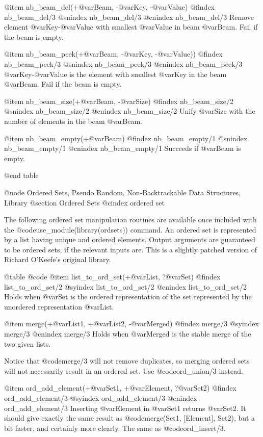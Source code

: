 {{{{{{{{{@item nb_beam_del(+@var{Beam}, -@var{Key}, -@var{Value})
@findex nb_beam_del/3
@snindex nb_beam_del/3
@cnindex nb_beam_del/3
Remove element @var{Key}-@var{Value} with smallest @var{Value} in beam
@var{Beam}. Fail if the beam is empty.

@item nb_beam_peek(+@var{Beam}, -@var{Key}, -@var{Value}))
@findex nb_beam_peek/3
@snindex nb_beam_peek/3
@cnindex nb_beam_peek/3
@var{Key}-@var{Value} is the element with smallest @var{Key} in the beam
@var{Beam}. Fail if the beam is empty.

@item nb_beam_size(+@var{Beam}, -@var{Size})
@findex nb_beam_size/2
@snindex nb_beam_size/2
@cnindex nb_beam_size/2
Unify @var{Size} with the number of elements in the beam  @var{Beam}.

@item nb_beam_empty(+@var{Beam})
@findex nb_beam_empty/1
@snindex nb_beam_empty/1
@cnindex nb_beam_empty/1
Succeeds if  @var{Beam} is empty.

@end table


@node Ordered Sets, Pseudo Random, Non-Backtrackable Data Structures, Library
@section Ordered Sets
@cindex ordered set

The following ordered set manipulation routines are available once
included with the @code{use_module(library(ordsets))} command.  An
ordered set is represented by a list having unique and ordered
elements. Output arguments are guaranteed to be ordered sets, if the
relevant inputs are. This is a slightly patched version of Richard
O'Keefe's original library.

@table @code
@item list_to_ord_set(+@var{List}, ?@var{Set})
@findex list_to_ord_set/2
@syindex list_to_ord_set/2
@cnindex list_to_ord_set/2
Holds when @var{Set} is the ordered representation of the set
represented by the unordered representation @var{List}.

@item merge(+@var{List1}, +@var{List2}, -@var{Merged})
@findex merge/3
@syindex merge/3
@cnindex merge/3
Holds when @var{Merged} is the stable merge of the two given lists.

Notice that @code{merge/3} will not remove duplicates, so merging
ordered sets will not necessarily result in an ordered set. Use
@code{ord_union/3} instead.

@item ord_add_element(+@var{Set1}, +@var{Element}, ?@var{Set2})
@findex ord_add_element/3
@syindex ord_add_element/3
@cnindex ord_add_element/3
Inserting @var{Element} in @var{Set1} returns @var{Set2}.  It should give
exactly the same result as @code{merge(Set1, [Element], Set2)}, but a
bit faster, and certainly more clearly. The same as @code{ord_insert/3}.

}}}}}}}}}

